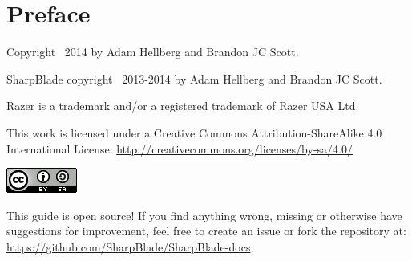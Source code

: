 \maketitle
\tableofcontents
\listoffigures
\listoftables
\lstlistoflistings
\chapter{Preface}
Copyright \textcopyright\ 2014 by Adam Hellberg and Brandon JC Scott.

SharpBlade copyright \textcopyright\ 2013-2014 by Adam Hellberg and Brandon JC Scott.

Razer is a trademark and/or a registered trademark of Razer USA Ltd.

This work is licensed under a Creative Commons Attribution\hyp{}ShareAlike 4.0 International License: \url{http://creativecommons.org/licenses/by-sa/4.0/}
\begin{center}
    \includegraphics[scale=1]{cc-by-sa.png}
\end{center}

This guide is open source! If you find anything wrong, missing or otherwise have suggestions for improvement, feel free to create an issue or fork the repository at: \url{https://github.com/SharpBlade/SharpBlade-docs}.
